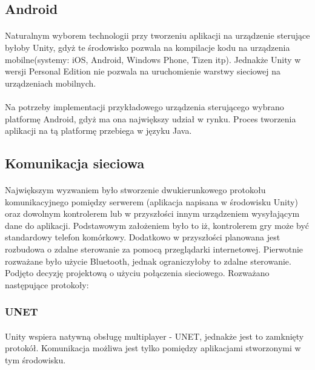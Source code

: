 \subsection{Android}
\paragraph{}
Naturalnym wyborem technologii przy tworzeniu aplikacji na urządzenie sterujące byłoby Unity, gdyż te środowisko pozwala na kompilacje kodu na urządzenia mobilne(systemy: iOS, Android, Windows Phone, Tizen itp\cite{unity2}). Jednakże Unity w wersji Personal Edition nie pozwala na uruchomienie warstwy sieciowej na urządzeniach mobilnych.
\paragraph{}
Na potrzeby implementacji przykładowego urządzenia sterującego wybrano platformę Android, gdyż ma ona największy udział w rynku.\cite{market} Proces tworzenia aplikacji na tą platformę przebiega w języku Java.

\subsection{Komunikacja sieciowa}
\paragraph{}
Największym wyzwaniem było stworzenie dwukierunkowego protokołu komunikacyjnego pomiędzy serwerem (aplikacja napisana w środowisku Unity) oraz dowolnym kontrolerem lub w przyszłości innym urządzeniem wysyłającym dane do aplikacji. Podstawowym założeniem było to iż, kontrolerem gry może być standardowy telefon komórkowy. Dodatkowo w przyszłości planowana jest rozbudowa o zdalne sterowanie za pomocą przeglądarki internetowej. Pierwotnie rozważane było użycie Bluetooth, jednak ograniczyłoby to zdalne sterowanie. Podjęto decyzję projektową o użyciu połączenia sieciowego. Rozważano następujące protokoły:

\subsubsection{UNET}
\paragraph{}
Unity wspiera natywną obsługę multiplayer - UNET, jednakże jest to zamknięty protokół. Komunikacja możliwa jest tylko pomiędzy aplikacjami stworzonymi w tym środowisku.

